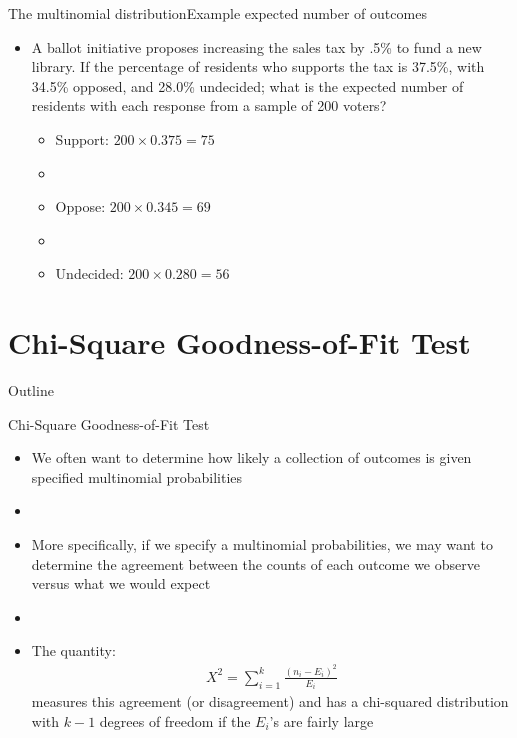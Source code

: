\documentclass[xcolor=dvipsnames]{beamer}
\begin{document}
\begin{frame}{The multinomial distribution}{Example expected number of outcomes}
	\begin{itemize}
		\item A ballot initiative proposes increasing the sales tax by .5\% to fund a new library. If the percentage of residents who supports the tax is 37.5\%, with 34.5\% opposed, and 28.0\% undecided; what is the expected number of residents with each response from a sample of 200 voters?
		\begin{itemize}
			\item Support: $200 \times 0.375 = 75$
			\item[]
			\item Oppose: $200 \times 0.345 = 69$
			\item[]
			\item Undecided: $200 \times 0.280 = 56$
		\end{itemize}
	\end{itemize}
\end{frame}

\section{Chi-Square Goodness-of-Fit Test}
\begin{frame}{Outline}
\tableofcontents[currentsection,subsectionstyle=show/shaded/hide]
\end{frame}

\begin{frame}{Chi-Square Goodness-of-Fit Test}
	\begin{itemize}
		\item We often want to determine how likely a collection of outcomes is given specified multinomial probabilities
		\item[]
		\item More specifically, if we specify a multinomial probabilities, we may want to determine the agreement between the counts of each outcome we observe versus what we would expect
		\item[]
		\item The quantity:
		\begin{gather*}
			X^2 = \sum_{i=1}^k \frac{(n_i-E_i)^2}{E_i}
		\end{gather*}
		measures this agreement (or disagreement) and has a chi-squared distribution with $k-1$ degrees of freedom if the $E_i$'s are fairly large
	\end{itemize}
\end{frame}
\end{document}
